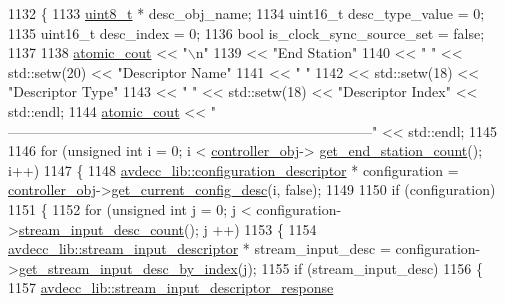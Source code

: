 \begin{DoxyCode}
1132 \{
1133     \hyperlink{stdint_8h_aba7bc1797add20fe3efdf37ced1182c5}{uint8\_t} * desc\_obj\_name;
1134     uint16\_t desc\_type\_value = 0;
1135     uint16\_t desc\_index = 0;
1136     \textcolor{keywordtype}{bool} is\_clock\_sync\_source\_set = \textcolor{keyword}{false};
1137 
1138     \hyperlink{cmd__line_8h_a0bc38ccc65c79ba06c6fcd7b4bf554c3}{atomic\_cout} << \textcolor{stringliteral}{"\(\backslash\)n"}
1139                 << \textcolor{stringliteral}{"End Station"}
1140                 << \textcolor{stringliteral}{"  "} << std::setw(20) << \textcolor{stringliteral}{"Descriptor Name"}
1141                 << \textcolor{stringliteral}{"  "}
1142                 << std::setw(18) << \textcolor{stringliteral}{"Descriptor Type"}
1143                 << \textcolor{stringliteral}{"  "} << std::setw(18) << \textcolor{stringliteral}{"Descriptor Index"} << std::endl;
1144     \hyperlink{cmd__line_8h_a0bc38ccc65c79ba06c6fcd7b4bf554c3}{atomic\_cout} << \textcolor{stringliteral}{"
      ------------------------------------------------------------------------------"} << std::endl;
1145 
1146     \textcolor{keywordflow}{for} (\textcolor{keywordtype}{unsigned} \textcolor{keywordtype}{int} i = 0; i < \hyperlink{classcmd__line_af0a7784509e5bf1210a2aa19cea5df70}{controller\_obj}->
      \hyperlink{classavdecc__lib_1_1controller_ab5ddf7b4a9718fe3e821289141f44485}{get\_end\_station\_count}(); i++)
1147     \{
1148         \hyperlink{classavdecc__lib_1_1configuration__descriptor}{avdecc\_lib::configuration\_descriptor} * configuration = 
      \hyperlink{classcmd__line_af0a7784509e5bf1210a2aa19cea5df70}{controller\_obj}->\hyperlink{classavdecc__lib_1_1controller_af249ed146464b54d7fc9d87f67bcff46}{get\_current\_config\_desc}(i, \textcolor{keyword}{false});
1149 
1150         \textcolor{keywordflow}{if} (configuration)
1151         \{
1152             \textcolor{keywordflow}{for} (\textcolor{keywordtype}{unsigned} \textcolor{keywordtype}{int} j = 0; j < configuration->\hyperlink{classavdecc__lib_1_1configuration__descriptor_ab7ef88f0a1d5d8c27f0c4c6687f6a98e}{stream\_input\_desc\_count}(); j
      ++)
1153             \{
1154                 \hyperlink{classavdecc__lib_1_1stream__input__descriptor}{avdecc\_lib::stream\_input\_descriptor} * stream\_input\_desc 
      = configuration->\hyperlink{classavdecc__lib_1_1configuration__descriptor_a69cfe9032cea21937b4153878f8a925c}{get\_stream\_input\_desc\_by\_index}(j);
1155                 \textcolor{keywordflow}{if} (stream\_input\_desc)
1156                 \{
1157                     \hyperlink{classavdecc__lib_1_1stream__input__descriptor__response}{avdecc\_lib::stream\_input\_descriptor\_response}

\end{DoxyCode}

